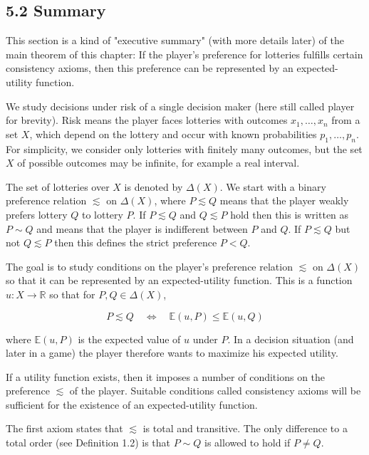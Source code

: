 \documentclass[12pt]{article}
\begin{document}
\subsection*{5.2 Summary}
This section is a kind of "executive summary" (with more details later) of the main theorem of this chapter: If the player's preference for lotteries fulfills certain consistency axioms, then this preference can be represented by an expected-utility function.

We study decisions under risk of a single decision maker (here still called player for brevity). Risk means the player faces lotteries with outcomes $x_{1}, \ldots, x_{n}$ from a set $X$, which depend on the lottery and occur with known probabilities $p_{1}, \ldots, p_{n}$. For simplicity, we consider only lotteries with finitely many outcomes, but the set $X$ of possible outcomes may be infinite, for example a real interval.

The set of lotteries over $X$ is denoted by $\Delta(X)$. We start with a binary preference relation $\lesssim$ on $\Delta(X)$, where $P \lesssim Q$ means that the player weakly prefers lottery $Q$ to lottery $P$. If $P \lesssim Q$ and $Q \lesssim P$ hold then this is written as $P \sim Q$ and means that the player is indifferent between $P$ and $Q$. If $P \lesssim Q$ but not $Q \lesssim P$ then this defines the strict preference $P<Q$.

The goal is to study conditions on the player's preference relation $\lesssim$ on $\Delta(X)$ so that it can be represented by an expected-utility function. This is a function $u: X \rightarrow \mathbb{R}$ so that for $P, Q \in \Delta(X)$,


\begin{equation*}
P \lesssim Q \quad \Leftrightarrow \quad \mathbb{E}(u, P) \leq \mathbb{E}(u, Q) \tag{5.1}
\end{equation*}


where $\mathbb{E}(u, P)$ is the expected value of $u$ under $P$. In a decision situation (and later in a game) the player therefore wants to maximize his expected utility.

If a utility function exists, then it imposes a number of conditions on the preference $\lesssim$ of the player. Suitable conditions called consistency axioms will be sufficient for the existence of an expected-utility function.

The first axiom states that $\lesssim$ is total and transitive. The only difference to a total order (see Definition 1.2) is that $P \sim Q$ is allowed to hold if $P \neq Q$.
\end{document}

